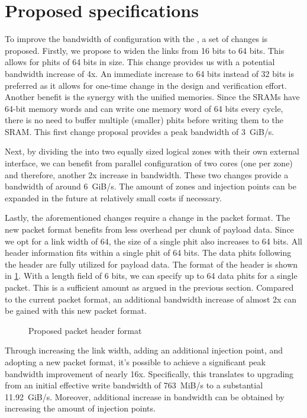 \section{Proposed specifications}
\label{sec:proposed_noc}
To improve the bandwidth of configuration with the \confignoc{}, a set of changes is proposed. Firstly, we propose to widen the links from 16 bits to 64 bits.
This allows for phits of 64 bits in size.
This change provides us with a potential bandwidth increase of 4x.
An immediate increase to 64 bits instead of 32 bits is preferred as it allows for one-time change in the design and verification effort.
Another benefit is the synergy with the unified memories.
Since the SRAMs have 64-bit memory words and can write one memory word of 64 bits every cycle, there is no need to buffer multiple (smaller) phits before writing them to the SRAM.
This first change proposal provides a peak bandwidth of \SI{3}{GiB/s}.

Next, by dividing the \confignoc{} into two equally sized logical zones with their own external interface, we can benefit from parallel configuration of two cores (one per zone) and therefore, another 2x increase in bandwidth.
These two changes provide a bandwidth of around \SI{6}{GiB/s}. 
The amount of zones and injection points can be expanded in the future at relatively small costs if necessary.

Lastly, the aforementioned changes require a change in the packet format.
The new packet format benefits from less overhead per chunk of payload data.
Since we opt for a link width of 64, the size of a single phit also increases to 64 bits.
All header information fits within a single phit of 64 bits.
The data phits following the header are fully utilized for payload data.
The format of the header is shown in \cref{fig:packet_format_header_new}.
With a length field of 6 bits, we can specify up to 64 data phits for a single packet.
This is a sufficient amount as argued in the previous section. 
Compared to the current packet format, an additional bandwidth increase of almost 2x can be gained with this new packet format.

\begin{figure}[hbtp]
    \centering
    \resizebox{\linewidth}{!}{
        
    }
    \caption{Proposed packet header format}
    \label{fig:packet_format_header_new}
\end{figure}

Through increasing the link width, adding an additional injection point, and adopting a new packet format, it's possible to achieve a significant peak bandwidth improvement of nearly 16x.
Specifically, this translates to upgrading from an initial effective write bandwidth of \SI{763}{MiB/s} to a substantial \SI{11.92}{GiB/s}.
Moreover, additional increase in bandwidth can be obtained by increasing the amount of injection points.
